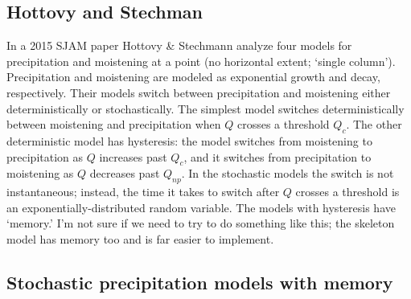 \documentclass[10pt]{article}
\begin{document}
\subsection{Hottovy and Stechman}
In a 2015 SJAM paper Hottovy \& Stechmann analyze four models for precipitation and moistening at a point (no horizontal extent; `single column').
Precipitation and moistening are modeled as exponential growth and decay, respectively.
Their models switch between precipitation and moistening either deterministically or stochastically.
The simplest model switches deterministically between moistening and precipitation when $Q$ crosses a threshold $Q_c$.
The other deterministic model has hysteresis: the model switches from moistening to precipitation as $Q$ increases past $Q_c$, and it switches from precipitation to moistening as $Q$ decreases past $Q_{np}$.
In the stochastic models the switch is not instantaneous; instead, the time it takes to switch after $Q$ crosses a threshold is an exponentially-distributed random variable.
The models with hysteresis have `memory.'
I'm not sure if we need to try to do something like this; the skeleton model has memory too and is far easier to implement.

\subsection{Stochastic precipitation models with memory}



\clearpage


\end{document}

